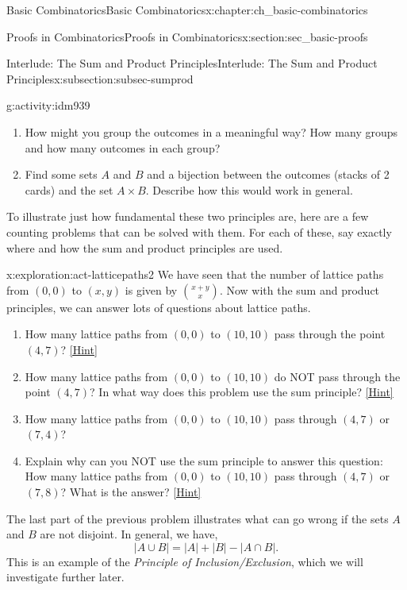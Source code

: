 \documentclass[oneside,10pt,]{book}
\numberwithin{equation}{chapter}
\newcommand{\card}[1]{\left| #1 \right|}
\begin{document}
\begin{chapterptx}{Basic Combinatorics}{}{Basic Combinatorics}{}{}{x:chapter:ch_basic-combinatorics}
\begin{sectionptx}{Proofs in Combinatorics}{}{Proofs in Combinatorics}{}{}{x:section:sec_basic-proofs}
\begin{subsectionptx}{Interlude: The Sum and Product Principles}{}{Interlude: The Sum and Product Principles}{}{}{x:subsection:subsec-sumprod}
\begin{activity}{}{g:activity:idm939}
\begin{enumerate}[font=\bfseries,label=(\alph*),ref=\alph*]
\item{}How might you group the outcomes in a meaningful way?  How many groups and how many outcomes in each group?%
\item{}Find some sets \(A\) and \(B\) and a bijection between the outcomes (stacks of 2 cards) and the set \(A \times B\).  Describe how this would work in general.%
\end{enumerate}
\end{activity}
To illustrate just how fundamental these two principles are, here are a few counting problems that can be solved with them.  For each of these, say exactly where and how the sum and product principles are used.%
\begin{exploration}{}{x:exploration:act-latticepaths2}%
We have seen that the number of lattice paths from \((0,0)\) to \((x,y)\) is given by \(\binom{x+y}{x}\).  Now with the sum and product principles, we can answer lots of questions about lattice paths.%
\begin{enumerate}[font=\bfseries,label=(\alph*),ref=\alph*]
\item{}How many lattice paths from \((0,0)\) to \((10,10)\) pass through the point \((4,7)\)?%
\space\hspace*{0pt}\hfill{\tiny\hyperlink{g:hint:idm963-back}{[Hint]}}\item{}How many lattice paths from \((0,0)\) to \((10,10)\) do NOT pass through the point \((4,7)\)?  In what way does this problem use the sum principle?%
\space\hspace*{0pt}\hfill{\tiny\hyperlink{g:hint:idm972-back}{[Hint]}}\item{}How many lattice paths from \((0,0)\) to \((10,10)\) pass through \((4,7)\) or \((7,4)\)?%
\item{}Explain why can you NOT use the sum principle to answer this question: How many lattice paths from \((0,0)\) to \((10,10)\) pass through \((4,7)\) or \((7,8)\)?  What is the answer?%
\space\hspace*{0pt}\hfill{\tiny\hyperlink{g:hint:idm990-back}{[Hint]}}\end{enumerate}
\end{exploration}
The last part of the previous problem illustrates what can go wrong if the sets \(A\) and \(B\) are not disjoint.  In general, we have,%
\begin{equation*}
\card{A \cup B} = \card{A} + \card{B} - \card{A \cap B}.
\end{equation*}
This is an example of the \emph{Principle of Inclusion\slash{}Exclusion}, which we will investigate further later.%

\end{subsectionptx}
\end{sectionptx}
\end{chapterptx}
\end{document}
